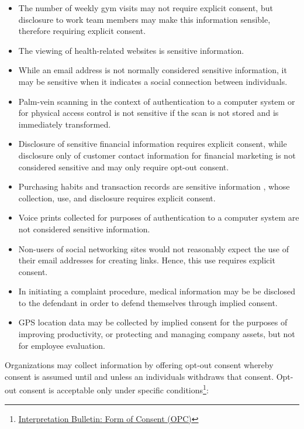 \begin{itemize}
   \item The number of weekly gym visits may not require explicit consent, but disclosure to work team members may make this information sensible, therefore requiring explicit consent.
   \item The viewing of health-related websites is sensitive information.
   \item While an email address is not normally considered sensitive information, it may be sensitive when it indicates a social connection between individuals.
   \item Palm-vein scanning in the context of authentication to a computer system or for physical access control is not sensitive if the scan is not stored and is immediately transformed.
   \item Disclosure of sensitive financial information requires explicit consent, while disclosure only of customer contact information for financial marketing is not considered sensitive and may only require opt-out consent.
   \item Purchasing habits and transaction records are sensitive information , whose collection, use, and disclosure requires explicit consent.
   \item Voice prints collected for purposes of authentication to a computer system are not considered sensitive information.
   \item Non-users of social networking sites would not reasonably expect the use of their email addresses for creating links. Hence, this use requires explicit consent.
   \item In initiating a complaint procedure, medical information may be be disclosed to the defendant in order to defend themselves through implied consent.
   \item GPS location data may be collected by implied consent for the purposes of improving productivity, or protecting and managing company assets, but not for employee evaluation.
\end{itemize}

Organizations may collect information by offering opt-out consent whereby consent is assumed until and unless an individuals withdraws that consent. Opt-out consent is acceptable only under specific conditions\footnote{\href{https://www.priv.gc.ca/en/privacy-topics/privacy-laws-in-canada/the-personal-information-protection-and-electronic-documents-act-pipeda/pipeda-compliance-help/pipeda-interpretation-bulletins/interpretations_07_consent/}{Interpretation Bulletin: Form of Consent (OPC)}}:

